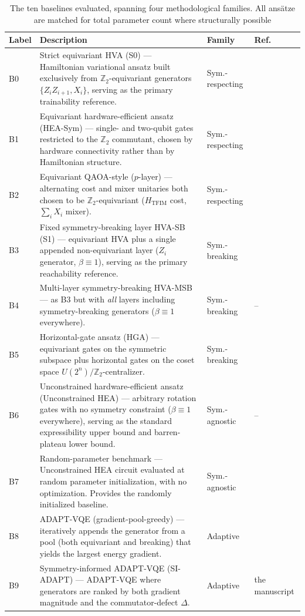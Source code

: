 \documentclass[10pt,twocolumn]{article}
\theoremstyle{remark}
\begin{document}
\begin{table}[t]
\centering
\caption{The ten baselines evaluated, spanning four methodological families. All ans\"atze are matched for total parameter count where structurally possible}
\label{tab:baselines}
\begin{tabular}{p{} p{} p{} p{}}
\hline\hline
\textbf{Label} & \textbf{Description} & \textbf{Family} & \textbf{Ref.} \\ \hline
B0 & Strict equivariant HVA (S0) --- Hamiltonian variational ansatz built exclusively from $\mathbb{Z}_2$-equivariant generators $\{Z_i Z_{i+1}, X_i\}$, serving as the primary trainability reference. & Sym.-respecting & \cite{nguyen2024theory} \\
B1 & Equivariant hardware-efficient ansatz (HEA-Sym) --- single- and two-qubit gates restricted to the $\mathbb{Z}_2$ commutant, chosen by hardware connectivity rather than by Hamiltonian structure. & Sym.-respecting & \cite{larocca2022group} \\
B2 & Equivariant QAOA-style ($p$-layer) --- alternating cost and mixer unitaries both chosen to be $\mathbb{Z}_2$-equivariant ($H_{\text{TFIM}}$ cost, $\sum_i X_i$ mixer). & Sym.-respecting & \cite{farhi2014quantum} \\
\hline
B3 & Fixed symmetry-breaking layer HVA-SB (S1) --- equivariant HVA plus a single appended non-equivariant layer ($Z_i$ generator, $\beta \equiv 1$), serving as the primary reachability reference. & Sym.-breaking & \cite{park2021symmetry,park2024symmetry} \\
B4 & Multi-layer symmetry-breaking HVA-MSB --- as B3 but with \textit{all} layers including symmetry-breaking generators ($\beta \equiv 1$ everywhere). & Sym.-breaking & -- \\
B5 & Horizontal-gate ansatz (HGA) --- equivariant gates on the symmetric subspace plus horizontal gates on the coset space $U(2^n)/\mathbb{Z}_2$-centralizer. & Sym.-breaking & \cite{wiersema2025geometric} \\
\hline
B6 & Unconstrained hardware-efficient ansatz (Unconstrained HEA) --- arbitrary rotation gates with no symmetry constraint ($\beta \equiv 1$ everywhere), serving as the standard expressibility upper bound and barren-plateau lower bound. & Sym.-agnostic & -- \\
B7 & Random-parameter benchmark --- Unconstrained HEA circuit evaluated at random parameter initialization, with no optimization. Provides the randomly initialized baseline. & Sym.-agnostic & \cite{mcclean2018barren} \\
\hline
B8 & ADAPT-VQE (gradient-pool-greedy) --- iteratively appends the generator from a pool (both equivariant and breaking) that yields the largest energy gradient. & Adaptive & \cite{grimsley2019adapt} \\
B9 & Symmetry-informed ADAPT-VQE (SI-ADAPT) --- ADAPT-VQE where generators are ranked by both gradient magnitude and the commutator-defect $\Delta$. & Adaptive & the manuscript \\
\hline\hline
\end{tabular}
\end{table}
\end{document}
